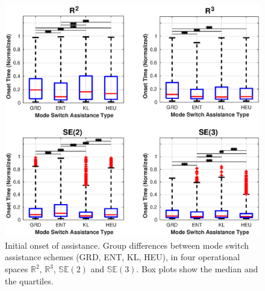 \documentclass[letterpaper, 10 pt, conference]{ieeeconf}  %
\begin{document}
\begin{figure}[t!]
	\centering
	\includegraphics[width= 1.01\hsize, height=0.35\vsize, center]{./figures/onset_time.eps}
	\vspace{-0.75cm}
	\caption{Initial onset of assistance. Group differences between mode switch assistance schemes (GRD, ENT, KL, HEU), in four operational spaces $\mathbb{R}^2$, $\mathbb{R}^3$, $\mathbb{SE}(2)$ and $\mathbb{SE}(3)$. Box plots show the median and the quartiles.} 
	\label{fig:initial_alpha}
\end{figure}
\end{document}
